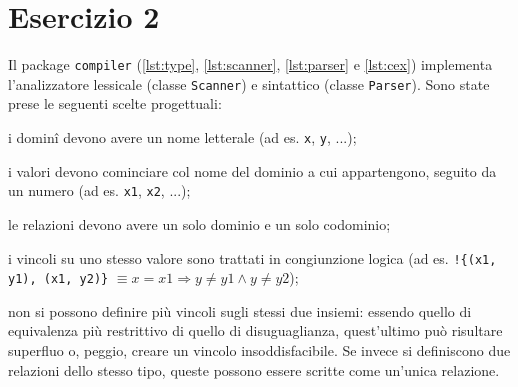 \section*{Esercizio 2}

Il package {\tt compiler} (\autoref{lst:type}, \ref{lst:scanner},
\ref{lst:parser} e \ref{lst:cex}) implementa l'analizzatore lessicale (classe
{\tt Scanner}) e sintattico (classe {\tt Parser}). Sono state prese le seguenti
scelte progettuali: %
%
\begin{enumerate*}

    \item i dominî devono avere un nome letterale (ad es. {\tt x}, {\tt y}, ...);

    \item i valori devono cominciare col nome del dominio a cui appartengono,
    seguito da un numero (ad es. {\tt x1}, {\tt x2}, ...);

    \item le relazioni devono avere un solo dominio e un solo codominio;

    \item i vincoli su uno stesso valore sono trattati in congiunzione logica
    (ad es. {\tt !\{(x1, y1), (x1, y2)\}} $\equiv x = x1 \Rightarrow y \neq y1
    \land y \neq y2$);

    \item non si possono definire più vincoli sugli stessi due insiemi: essendo
    quello di equivalenza più restrittivo di quello di disuguaglianza,
    quest'ultimo può risultare superfluo o, peggio, creare un vincolo
    insoddisfacibile. Se invece si definiscono due relazioni dello stesso tipo,
    queste possono essere scritte come un'unica relazione.

\end{enumerate*}
%
%

